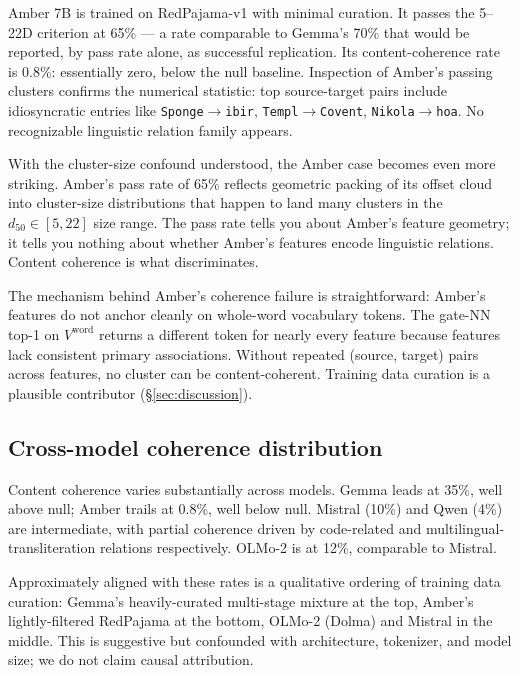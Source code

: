 \documentclass[11pt,letterpaper]{article}
\begin{document}
Amber 7B \citep{liu2023llm360} is trained on RedPajama-v1 with minimal curation. It passes the 5--22D criterion at 65\% --- a rate comparable to Gemma's 70\% that would be reported, by pass rate alone, as successful replication. Its content-coherence rate is 0.8\%: essentially zero, below the null baseline. Inspection of Amber's passing clusters confirms the numerical statistic: top source-target pairs include idiosyncratic entries like \texttt{Sponge$\to$ibir}, \texttt{Templ$\to$Covent}, \texttt{Nikola$\to$hoa}. No recognizable linguistic relation family appears.

With the cluster-size confound understood, the Amber case becomes even more striking. Amber's pass rate of 65\% reflects geometric packing of its offset cloud into cluster-size distributions that happen to land many clusters in the $d_{50} \in [5, 22]$ size range. The pass rate tells you about Amber's feature geometry; it tells you nothing about whether Amber's features encode linguistic relations. Content coherence is what discriminates.

The mechanism behind Amber's coherence failure is straightforward: Amber's features do not anchor cleanly on whole-word vocabulary tokens. The gate-NN top-1 on $V^{\mathrm{word}}$ returns a different token for nearly every feature because features lack consistent primary associations. Without repeated (source, target) pairs across features, no cluster can be content-coherent. Training data curation is a plausible contributor (\S\ref{sec:discussion}).

\subsection{Cross-model coherence distribution}

Content coherence varies substantially across models. Gemma leads at 35\%, well above null; Amber trails at 0.8\%, well below null. Mistral (10\%) and Qwen (4\%) are intermediate, with partial coherence driven by code-related and multilingual-transliteration relations respectively. OLMo-2 is at 12\%, comparable to Mistral.

Approximately aligned with these rates is a qualitative ordering of training data curation: Gemma's heavily-curated multi-stage mixture at the top, Amber's lightly-filtered RedPajama at the bottom, OLMo-2 (Dolma) and Mistral in the middle. This is suggestive but confounded with architecture, tokenizer, and model size; we do not claim causal attribution.
\end{document}

